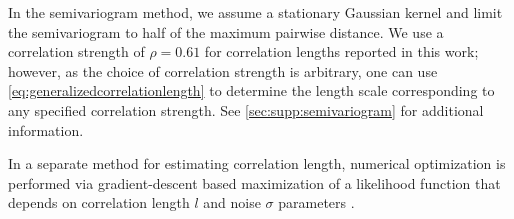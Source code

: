 \documentclass[final,twocolumn,12pt]{elsarticle}
\begin{document}
    In the semivariogram method, we assume a stationary Gaussian kernel and limit the semivariogram to half of the maximum pairwise distance. We use a correlation strength of $\rho = 0.61$ for correlation lengths reported in this work; however, as the choice of correlation strength is arbitrary, one can use \cref{eq:generalizedcorrelationlength} to determine the length scale corresponding to any specified correlation strength. See \cref{sec:supp:semivariogram} for additional information.
    
    In a separate method for estimating correlation length, numerical optimization is performed via gradient-descent based maximization of a likelihood function that depends on correlation length $l$ and noise $\sigma$ parameters \cite{ExactGPRMethod}.
    
    
    
\end{document}
